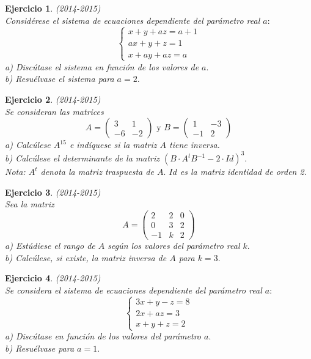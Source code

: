 \documentclass[12pt, a4paper]{amsart}
\newtheorem{ejer}{Ejercicio}
\begin{document}
\begin{ejer}\em (2014-2015)\\
Considérese el sistema de ecuaciones dependiente del parámetro real $a:$\\
\[
\left \{ \begin{matrix}
x+y+az=a+1
\\ax+y+z=1
\\ x+ay+az=a
\end{matrix}\right.
\]
a) Discútase el sistema en función de los valores de $a.$\\
b) Resuélvase el sistema para $a=2.$
\end{ejer}

\begin{ejer}\em  (2014-2015)\\
Se consideran las matrices
\[
A=\begin{pmatrix}
3 & 1
\\ -6 & -2
\end{pmatrix} \text{ y } B=\begin{pmatrix}
1 & -3
\\ -1 & 2
\end{pmatrix}
\]
a) Calcúlese $A^{15}$ e indíquese si la matriz $A$ tiene inversa.\\
b) Calcúlese el determinante de la matriz $(B\cdot A^tB^{-1}-2\cdot Id)^3.$\\
\em Nota: $A^t$ denota la matriz traspuesta de $A.$ $Id$ es la matriz identidad de orden 2.
\end{ejer}

\begin{ejer}\em  (2014-2015)\\
Sea la matriz
\[
A=\begin{pmatrix}
2 & 2 & 0
\\ 0 & 3 & 2
\\ -1 & k & 2
\end{pmatrix}
\]
a) Estúdiese el rango de $A$ según los valores del parámetro real $k.$\\
b) Calcúlese, si existe, la matriz inversa de $A$ para $k=3.$
\end{ejer}

\begin{ejer}\em  (2014-2015)\\
Se considera el sistema de ecuaciones dependiente del parámetro real $a:$
\[
\left \{ \begin{matrix}
3x+y-z=8
\\ 2x+az=3
\\ x+y+z=2
\end{matrix}\right.
\]
a) Discútase en función de los valores del parámetro $a.$\\
b) Resuélvase para $a=1.$
\end{ejer}
\end{document}
